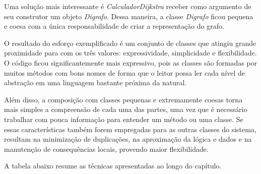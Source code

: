 Uma solução mais interessante é \textit{CalculadorDijkstra} receber como argumento de seu construtor um objeto \textit{Digrafo}. Dessa maneira, a classe \textit{Digrafo} ficou pequena e coesa com a única responsabilidade de criar a representação do grafo.


 
O resultado do esforço exemplificado é um conjunto de classes que atingiu grande proximidade para com os três valores: 
expressividade, simplicidade e flexibilidade.
O código ficou significantemente mais expressivo, pois as classes são formadas por muitos métodos com bons nomes de forma que o leitor possa ler cada nível de abstração em uma linguagem bastante próxima da natural.
 
Além disso, a composição com classes pequenas e extremamente coesas torna mais simples a compreensão de cada uma das partes, uma vez que é necessário trabalhar com pouca informação para entender um método ou uma classe. Se essas características também forem empregadas para as outras classes do sistema, resultam na minimização de duplicações, na aproximação da lógica e dados e na manutenção de consequências locais, provendo maior flexibilidade.

A tabela abaixo resume as técnicas apresentadas ao longo do capítulo.

\newenvironment{my_itemize}
{\begin{list}{\labelitemi}
{  \setlength{\itemsep}{0pt}
  \setlength{\parskip}{0pt}
  \setlength{\parsep}{0pt}
  \setlength{\topsep}{0pt}
  \setlength{\partopsep}{0pt}
  \setlength{\leftmargin}{1em}
  \setlength{\rightmargin}{0.5em}
  \setlength{\topmargin}{0.5em}
}
}
{\end{list}}    
     

